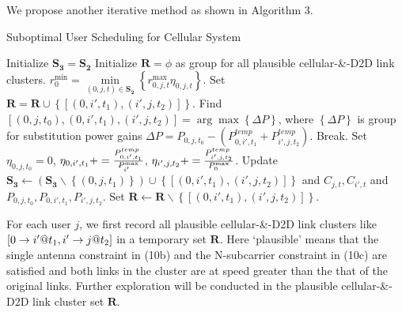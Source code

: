 \documentclass{ieeeaccess}
\begin{document}
We propose another iterative method as shown in Algorithm 3.

\begin{algorithm}[!h]
\caption{Suboptimal User Scheduling for Cellular System}
\label{alg:1}
\begin{algorithmic}[1]
\STATE Initialize ${{\mathbf{S}}_{\mathbf{3}}}={{\mathbf{S}}_{\mathbf{2}}}$
  \STATE Initialize ${\mathbf{R}} = \phi $ as group for all plausible cellular-\&-D2D link clusters.
  \STATE $r_0^{\min } = \mathop {\min }\limits_{\left( {0,j,t} \right) \in {{\mathbf{S}}_{\mathbf{2}}}} \left\{ {r_{0,j,t}^{\max }{\eta _{0,j,t}}} \right\}$.
            \STATE Set ${\mathbf{R = R}} \cup \left\{ {\left[ {\left( {0,i',{t_1}} \right),\left( {i',j,{t_2}} \right)} \right]} \right\}$.
          \ENDIF
        \ENDFOR
      \ENDIF
    \ENDFOR
  \ENDFOR
    \STATE Find $\left[ {\left( {0,j,{t_0}} \right),\left( {0,i',{t_1}} \right),\left( {i',j,{t_2}} \right)} \right] = \arg \max \left\{ {\Delta P} \right\}$, where ${\left\{ {\Delta P} \right\}}$ is group for substitution power gains $\Delta P = {P_{0,j,{t_0}}} - \left( {{P_{0,i',{t_1}}^{temp}} + {P_{i',j,{t_2}}^{temp}}} \right)$. 
      \STATE Break.
    \ENDIF
    \STATE Set ${\eta _{0,j,{t_0}} = 0}$, ${\eta _{0,i',{t_1}}} += \frac{{{P_{0,i',{t_1}}^{{\rm{temp}}}}}}{{P_{i'}^{\max }}}$, ${\eta _{i',j,{t_2}}} += \frac{{{P_{i',j,{t_2}}^{{\rm{temp}}}}}}{{P_{0}^{\max }}}$.
    \STATE Update ${{\mathbf{S}}_{\mathbf{3}}} \leftarrow \left( {{{\mathbf{S}}_{\mathbf{3}}}\backslash \left\{ {\left( {0,j,{t_1}} \right)} \right\}} \right) \cup \left\{ {\left[ {\left( {0,i',{t_1}} \right),\left( {i',j,{t_2}} \right)} \right]} \right\}$ and ${C_{j,t}},{C_{i',t}}$ and ${P_{0,j,{t_0}}},{P_{0,i',{t_1}}},{P_{i',j,{t_2}}}$.
    \STATE Set $\mathbf{R} \leftarrow \mathbf{R}\backslash \left\{ {\left[ {\left( {0,i',{t_1}} \right),\left( {i',j,{t_2}} \right)} \right]} \right\}$.
  \ENDWHILE
\ENDFOR
\end{algorithmic}
\end{algorithm}


For each user $j$, we first record all plausible cellular-\&-D2D link clusters like $\left[ {{\rm{0}} \to i'@{t_1},i' \to j@{t_2}} \right]$ in a temporary set $\mathbf{R}$. Here `plausible' means that the single antenna constraint in (10b) and the N-subcarrier constraint in (10c) are satisfied and both links in the cluster are at speed greater than the that of the original links. Further exploration will be conducted in the plausible cellular-\&-D2D link cluster set $\mathbf{R}$.
\end{document}
